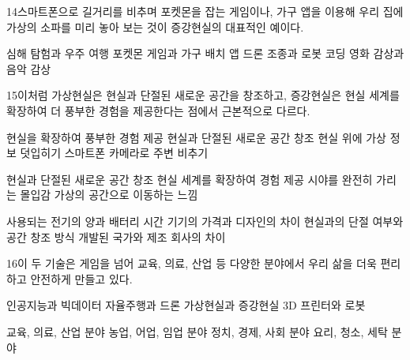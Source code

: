 \documentclass[fs85,seriesRus]{korfarm-base}
\begin{document}
\begin{kfSentenceUnit}{14}{스마트폰으로 길거리를 비추며 포켓몬을 잡는 게임이나, 가구 앱을 이용해 우리 집에 가상의 소파를 미리 놓아 보는 것이 증강현실의 대표적인 예이다.}
\begin{kfChoices}
\kfChoice 심해 탐험과 우주 여행
\kfChoice 포켓몬 게임과 가구 배치 앱
\kfChoice 드론 조종과 로봇 코딩
\kfChoice 영화 감상과 음악 감상
\end{kfChoices}
\end{kfSentenceUnit}

\begin{kfSentenceUnit}{15}{이처럼 가상현실은 현실과 단절된 새로운 공간을 창조하고, 증강현실은 현실 세계를 확장하여 더 풍부한 경험을 제공한다는 점에서 근본적으로 다르다.}
\begin{kfChoices}
\kfChoice 현실을 확장하여 풍부한 경험 제공
\kfChoice 현실과 단절된 새로운 공간 창조
\kfChoice 현실 위에 가상 정보 덧입히기
\kfChoice 스마트폰 카메라로 주변 비추기
\end{kfChoices}
\begin{kfChoices}
\kfChoice 현실과 단절된 새로운 공간 창조
\kfChoice 현실 세계를 확장하여 경험 제공
\kfChoice 시야를 완전히 가리는 몰입감
\kfChoice 가상의 공간으로 이동하는 느낌
\end{kfChoices}
\begin{kfChoices}
\kfChoice 사용되는 전기의 양과 배터리 시간
\kfChoice 기기의 가격과 디자인의 차이
\kfChoice 현실과의 단절 여부와 공간 창조 방식
\kfChoice 개발된 국가와 제조 회사의 차이
\end{kfChoices}
\end{kfSentenceUnit}

\begin{kfSentenceUnit}{16}{이 두 기술은 게임을 넘어 교육, 의료, 산업 등 다양한 분야에서 우리 삶을 더욱 편리하고 안전하게 만들고 있다.}
\begin{kfChoices}
\kfChoice 인공지능과 빅데이터
\kfChoice 자율주행과 드론
\kfChoice 가상현실과 증강현실
\kfChoice 3D 프린터와 로봇
\end{kfChoices}
\begin{kfChoices}
\kfChoice 교육, 의료, 산업 분야
\kfChoice 농업, 어업, 임업 분야
\kfChoice 정치, 경제, 사회 분야
\kfChoice 요리, 청소, 세탁 분야
\end{kfChoices}
\end{kfSentenceUnit}
\end{document}
